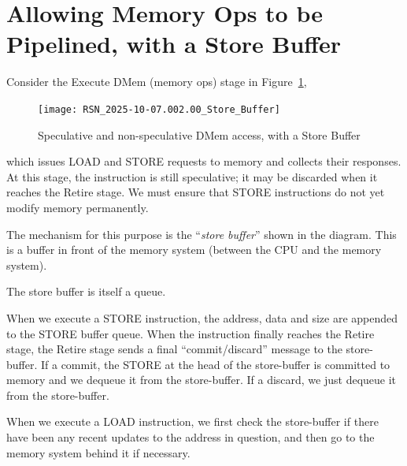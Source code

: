 
\section{Allowing Memory Ops to be Pipelined, with a Store Buffer}

\label{Sec_Store_Buffers}


Consider the Execute DMem (memory ops) stage in
Figure~\ref{Fig_RISCV_Store_Buffer},
\begin{figure}[htbp]
  \centerline{\texttt{[image: RSN\_2025-10-07.002.00\_Store\_Buffer]}}
  \caption{\label{Fig_RISCV_Store_Buffer}
           Speculative and non-speculative DMem access, with a Store Buffer}
\end{figure}
which issues LOAD and STORE requests to memory and collects their
responses.  At this stage, the instruction is still speculative; it
may be discarded when it reaches the Retire stage.  We must ensure
that STORE instructions do not yet modify memory permanently.

The mechanism for this purpose is the ``\emph{store buffer}'' shown in
the diagram.  This is a buffer in front of the memory system (between
the CPU and the memory system).

\begin{tightlist}

 \item The store buffer is itself a queue.

 \item When we execute a STORE instruction, the address, data and size
       are appended to the STORE buffer queue.  When the instruction
       finally reaches the Retire stage, the Retire stage sends a
       final ``commit/discard'' message to the store-buffer.  If a
       commit, the STORE at the head of the store-buffer is committed
       to memory and we dequeue it from the store-buffer.  If a
       discard, we just dequeue it from the store-buffer.

 \item When we execute a LOAD instruction, we first check the
       store-buffer if there have been any recent updates to the
       address in question, and then go to the memory system behind it
       if necessary.

\end{tightlist}


